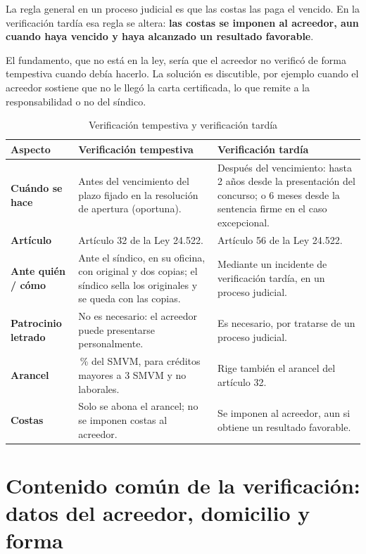 \documentclass[12pt,oneside]{book}
\begin{document}
La regla general en un proceso judicial es que las costas las paga el vencido. En la verificación tardía esa regla se altera: \textbf{las costas se imponen al acreedor, aun cuando haya vencido y haya alcanzado un resultado favorable}.

El fundamento, que no está en la ley, sería que el acreedor no verificó de forma tempestiva cuando debía hacerlo. La solución es discutible, por ejemplo cuando el acreedor sostiene que no le llegó la carta certificada, lo que remite a la responsabilidad o no del síndico.

\begin{table}[H]
\centering
\small
\caption{Verificación tempestiva y verificación tardía}
\begin{tabularx}{\textwidth}{>{\raggedright\arraybackslash\bfseries}p{2.6cm}>{\raggedright\arraybackslash}X>{\raggedright\arraybackslash}X}
\toprule
\textbf{Aspecto} & \textbf{Verificación tempestiva} & \textbf{Verificación tardía} \\
\midrule
Cuándo se hace & Antes del vencimiento del plazo fijado en la resolución de apertura (oportuna). & Después del vencimiento: hasta 2 años desde la presentación del concurso; o 6 meses desde la sentencia firme en el caso excepcional. \\
\addlinespace
Artículo & Artículo 32 de la Ley 24.522. & Artículo 56 de la Ley 24.522. \\
\addlinespace
Ante quién / cómo & Ante el síndico, en su oficina, con original y dos copias; el síndico sella los originales y se queda con las copias. & Mediante un incidente de verificación tardía, en un proceso judicial. \\
\addlinespace
Patrocinio letrado & No es necesario: el acreedor puede presentarse personalmente. & Es necesario, por tratarse de un proceso judicial. \\
\addlinespace
Arancel & 10\,\% del SMVM, para créditos mayores a 3 SMVM y no laborales. & Rige también el arancel del artículo 32. \\
\addlinespace
Costas & Solo se abona el arancel; no se imponen costas al acreedor. & Se imponen al acreedor, aun si obtiene un resultado favorable. \\
\bottomrule
\end{tabularx}
\end{table}

\section{Contenido común de la verificación: datos del acreedor, domicilio y forma}
\end{document}
